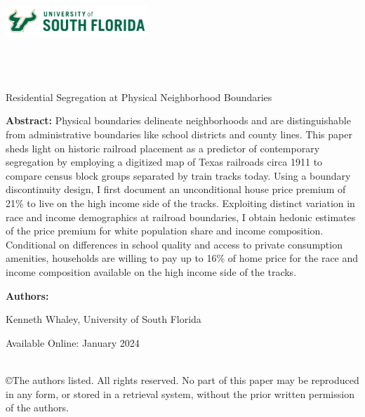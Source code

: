 \documentclass[11pt]{article}
\begin{document}
\onehalfspacing

\noindent \includegraphics[width = 0.4\textwidth]{USouthFlorida-lightbg-2c-rgb-h.png} \\

\noindent{\color{usfgreen} \rule{0.5\textwidth}{10pt}}{\color{usfgold} \rule{0.5\textwidth}{10pt}}\\

 \\
 \\

\vspace*{0.5in}

\begin{center} 
    \huge Residential Segregation at Physical Neighborhood Boundaries
\end{center}

\vspace*{0.5in}

\noindent \textbf{Abstract:} Physical boundaries delineate neighborhoods and are distinguishable from administrative boundaries like school districts and county lines. This paper sheds light on historic railroad placement as a predictor of contemporary segregation by employing a digitized map of Texas railroads circa 1911 to compare census block groups separated by train tracks today. Using a boundary discontinuity design, I first document an unconditional house price premium of 21\% to live on the high income side of the tracks. Exploiting distinct variation in race and income demographics at railroad boundaries, I obtain hedonic estimates of the price premium for white population share and income composition. Conditional on differences in school quality and access to private consumption amenities, households are willing to pay up to 16\% of home price for the race and income composition available on the high income side of the tracks.

\vspace*{0.25in}

\noindent \textbf{Authors:}

Kenneth Whaley, University of South Florida \\

\vspace*{0.25in}


\noindent Available Online: January 2024 %

\vfill 
\noindent{\color{usfgreen} \rule{\textwidth}{5pt}}\\
\noindent \small ©The authors listed. All rights reserved. No part of this paper may be reproduced in any form, or stored in a retrieval system, without the prior written permission of the authors.
\thispagestyle{empty}
\end{document}
